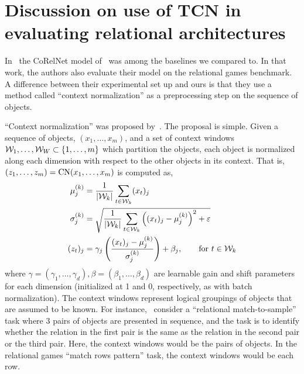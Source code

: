 \section{Discussion on use of TCN in evaluating relational architectures}\label{sec:appendix_tcn_discussion}

In~ the CoRelNet model of~\citet{kergNeuralArchitecture2022} was among the baselines we compared to. In that work, the authors also evaluate their model on the relational games benchmark. A difference between their experimental set up and ours is that they use a method called ``context normalization'' as a preprocessing step on the sequence of objects.

``Context normalization'' was proposed by~\citet{webbLearningRepresentationsThat2020}. The proposal is simple. Given a sequence of objects, $(x_1, \ldots, x_m)$, and a set of context windows ${\mathcal{W}}_1, \ldots, {\mathcal{W}}_W \subset \left\{1, \ldots, m\right\}$ which partition the objects, each object is normalized along each dimension with respect to the other objects in its context. That is, $\left(z_1, \ldots, z_m\right) = \mathrm{CN}(x_1, \ldots, x_m)$ is computed as,
\begin{eqnarray*}
    \begin{split}
        \mu_j^{(k)} &= \frac{1}{\left\lvert{\mathcal{W}}_k\right\rvert} \sum_{t \in {\mathcal{W}}_k} (x_t)_j\\
        \sigma_j^{(k)} &= \sqrt{ \frac{1}{\left\lvert{\mathcal{W}}_k\right\rvert} \sum_{t \in {\mathcal{W}}_k} \left((x_t)_j - \mu_j^{(k)}\right)^2 + \varepsilon}\\
        (z_t)_j &= \gamma_j \left(\frac{(x_t)_j - \mu_j^{(k)}}{\sigma_j^{(k)}}\right) + \beta_j, \qquad \text{for } t \in {\mathcal{W}}_k
    \end{split}
\end{eqnarray*}
where $\gamma = (\gamma_1, \ldots, \gamma_d), \beta = (\beta_1, \ldots, \beta_d)$ are learnable gain and shift parameters for each dimension (initialized at 1 and 0, respectively, as with batch normalization). The context windows represent logical groupings of objects that are assumed to be known. For instance,~\citep{webbEmergentSymbols2021,kergNeuralArchitecture2022} consider a ``relational match-to-sample'' task where 3 pairs of objects are presented in sequence, and the task is to identify whether the relation in the first pair is the same as the relation in the second pair or the third pair. Here, the context windows would be the pairs of objects. In the relational games ``match rows pattern'' task, the context windows would be each row.

